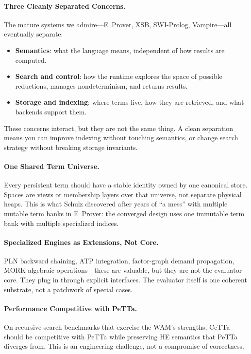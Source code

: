\documentclass[11pt]{article}
\newcommand{\PeTTa}{\textup{PeTTa}}
\newcommand{\HE}{\textup{HE}}
\newcommand{\CeTTa}{\textup{CeTTa}}
\newcommand{\MORK}{\textup{MORK}}
\newcommand{\WAM}{\textup{WAM}}
\newcommand{\XSB}{\textup{XSB}}
\begin{document}
\paragraph{Three Cleanly Separated Concerns.}
The mature systems we admire---E~Prover, \XSB{}, SWI-Prolog, Vampire---all
eventually separate:
\begin{itemize}
\item \textbf{Semantics}: what the language means, independent of how
  results are computed.
\item \textbf{Search and control}: how the runtime explores the space of
  possible reductions, manages nondeterminism, and returns results.
\item \textbf{Storage and indexing}: where terms live, how they are
  retrieved, and what backends support them.
\end{itemize}
These concerns interact, but they are not the same thing.  A clean
separation means you can improve indexing without touching semantics,
or change search strategy without breaking storage invariants.

\paragraph{One Shared Term Universe.}
Every persistent term should have a stable identity owned by one canonical
store.  Spaces are views or membership layers over that universe, not
separate physical heaps.  This is what Schulz discovered after years of
``a mess'' with multiple mutable term banks in E~Prover: the converged
design uses one immutable term bank with multiple specialized indices.

\paragraph{Specialized Engines as Extensions, Not Core.}
PLN backward chaining, ATP integration, factor-graph demand propagation,
\MORK{} algebraic operations---these are valuable, but they are not the
evaluator core.  They plug in through explicit interfaces.  The evaluator
itself is one coherent substrate, not a patchwork of special cases.

\paragraph{Performance Competitive with \PeTTa{}.}
On recursive search benchmarks that exercise the \WAM{}'s strengths,
\CeTTa{} should be competitive with \PeTTa{} while preserving \HE{}
semantics that \PeTTa{} diverges from.  This is an engineering challenge,
not a compromise of correctness.
\end{document}
